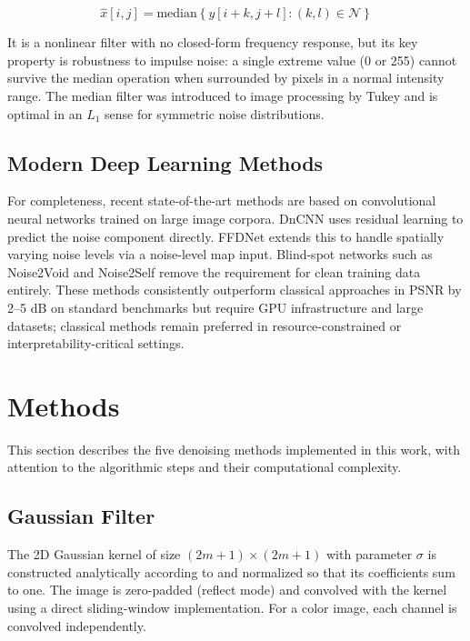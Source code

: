 \documentclass[conference]{IEEEtran}
\begin{document}
\begin{equation}
  \hat{x}[i,j] = \text{median}\!\left\{ y[i+k, j+l] : (k,l) \in \mathcal{N} \right\}
  \label{eq:median}
\end{equation}

It is a nonlinear filter with no closed-form frequency response, but its key property is robustness to impulse noise: a single extreme value (0 or 255) cannot survive the median operation when surrounded by pixels in a normal intensity range. The median filter was introduced to image processing by Tukey and is optimal in an $L_1$ sense for symmetric noise distributions.
    
\subsection{Modern Deep Learning Methods}

For completeness, recent state-of-the-art methods are based on convolutional neural networks trained on large image corpora. DnCNN uses residual learning to predict the noise component directly. FFDNet extends this to handle spatially varying noise levels via a noise-level map input. Blind-spot networks such as Noise2Void and Noise2Self remove the requirement for clean training data entirely. These methods consistently outperform classical approaches in PSNR by 2--5 dB on standard benchmarks but require GPU infrastructure and large datasets; classical methods remain preferred in resource-constrained or interpretability-critical settings.

\section{Methods}

This section describes the five denoising methods implemented in this work, with attention to the algorithmic steps and their computational complexity.

\subsection{Gaussian Filter}

The 2D Gaussian kernel of size $(2m+1) \times (2m+1)$ with parameter $\sigma$ is constructed analytically according to and normalized so that its coefficients sum to one. The image is zero-padded (reflect mode) and convolved with the kernel using a direct sliding-window implementation. For a color image, each channel is convolved independently.
\end{document}
